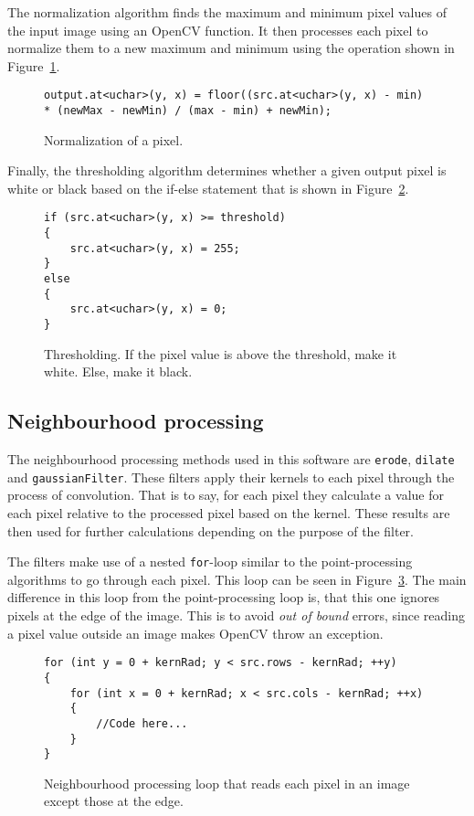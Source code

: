The normalization algorithm finds the maximum and minimum pixel values of the input image using an OpenCV function. It then processes each pixel to normalize them to a new maximum and minimum using the operation shown in Figure~\ref{fig:normalize}.

\begin{figure}
\begin{lstlisting}
output.at<uchar>(y, x) = floor((src.at<uchar>(y, x) - min) * (newMax - newMin) / (max - min) + newMin);
\end{lstlisting}
\caption{Normalization of a pixel. \label{fig:normalize}}
\end{figure} 

Finally, the thresholding algorithm determines whether a given output pixel is white or black based on the if-else statement that is shown in Figure~\ref{fig:threshold}.

\begin{figure}
\begin{lstlisting}
if (src.at<uchar>(y, x) >= threshold)
{
	src.at<uchar>(y, x) = 255;
}
else
{
	src.at<uchar>(y, x) = 0;
}
\end{lstlisting}
\caption{Thresholding. If the pixel value is above the threshold, make it white. Else, make it black.\label{fig:threshold}}
\end{figure}

\subsection{Neighbourhood processing}
The neighbourhood processing methods used in this software are \texttt{erode}, \texttt{dilate} and \texttt{gaussianFilter}. These filters apply their kernels to each pixel through the process of convolution. That is to say, for each pixel they calculate a value for each pixel relative to the processed pixel based on the kernel. These results are then used for further calculations depending on the purpose of the filter.

The filters make use of a nested \texttt{for}-loop similar to the point-processing algorithms to go through each pixel. This loop can be seen in Figure~\ref{fig:neighbourhoodForLoop}. The main difference in this loop from the point-processing loop is, that this one ignores pixels at the edge of the image. This is to avoid \textit{out of bound} errors, since reading a pixel value outside an image makes OpenCV throw an exception.

\begin{figure}
\begin{lstlisting}
for (int y = 0 + kernRad; y < src.rows - kernRad; ++y)
{
	for (int x = 0 + kernRad; x < src.cols - kernRad; ++x)
	{
		//Code here...
	}
}
\end{lstlisting}
\caption{Neighbourhood processing loop that reads each pixel in an image except those at the edge. \label{fig:neighbourhoodForLoop}}
\end{figure}

